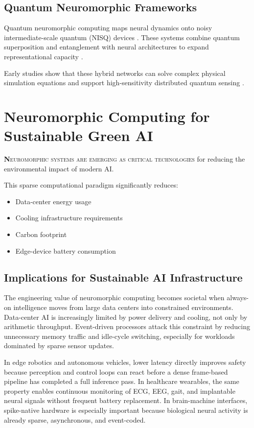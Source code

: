\documentclass[11pt]{article}
\newcommand{\sectionlead}[2]{\noindent\lettrine[lines=2,lhang=0.08,nindent=0.12em]{\textcolor{IEEEblue}{\bfseries #1}}{\hspace{0.03em}#2}}
\begin{document}
\subsection{Quantum Neuromorphic Frameworks}
Quantum neuromorphic computing maps neural dynamics onto noisy intermediate-scale quantum (NISQ) devices \cite{schuld2015quantum}. These systems combine quantum superposition and entanglement with neural architectures to expand representational capacity \cite{schuld2015quantum}.

Early studies show that these hybrid networks can solve complex physical simulation equations \cite{schuld2015quantum} and support high-sensitivity distributed quantum sensing \cite{giovannetti2011quantum}.

\section{Neuromorphic Computing for Sustainable Green AI}
\sectionlead{N}{euromorphic systems are emerging as critical technologies} for reducing the environmental impact of modern AI. 

This sparse computational paradigm significantly reduces:
\begin{itemize}
    \item Data-center energy usage
    \item Cooling infrastructure requirements
    \item Carbon footprint
    \item Edge-device battery consumption
\end{itemize}

\subsection{Implications for Sustainable AI Infrastructure}
The engineering value of neuromorphic computing becomes societal when always-on intelligence moves from large data centers into constrained environments. Data-center AI is increasingly limited by power delivery and cooling, not only by arithmetic throughput. Event-driven processors attack this constraint by reducing unnecessary memory traffic and idle-cycle switching, especially for workloads dominated by sparse sensor updates.

In edge robotics and autonomous vehicles, lower latency directly improves safety because perception and control loops can react before a dense frame-based pipeline has completed a full inference pass. In healthcare wearables, the same property enables continuous monitoring of ECG, EEG, gait, and implantable neural signals without frequent battery replacement. In brain-machine interfaces, spike-native hardware is especially important because biological neural activity is already sparse, asynchronous, and event-coded.
\end{document}
